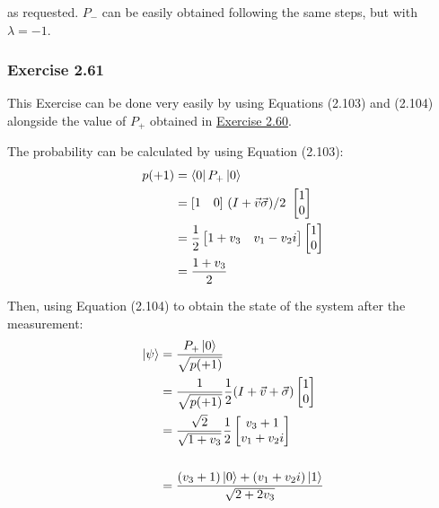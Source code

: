 as requested.
$P_-$ can be easily obtained following the same steps,
but with $\lambda = -1$.

\subsubsection{Exercise 2.61}
This Exercise can be done very easily by using Equations (2.103) and (2.104)
alongside the value of $P_+$ obtained in
\hyperref[sec:nielsen-and-chuang-exercise-2-60]{Exercise 2.60}.

The probability can be calculated by using Equation (2.103):
\begin{align}
    p(+1) &= \bra{0}P_+\ket{0} \\
    &= [ \begin{matrix} 1 & 0 \end{matrix} ]
        \ (I + \vec{v} \vec{\sigma}) / 2
        \ \left[ \begin{matrix} 1 \\ 0 \end{matrix} \right] \\
    &= \frac{1}{2} \left[ \begin{matrix} 1 + v_3 & v_1 - v_2i \end{matrix} \right]
        \left[ \begin{matrix} 1 \\ 0 \end{matrix} \right] \\
    &= \frac{1 + v_3}{2}
\end{align}

Then, using Equation (2.104) to obtain the state of the system
after the measurement:
\begin{align}
    \ket{\psi} &= \frac{P_+ \ket{0}}{\sqrt{p(+1)}} \\
    &= \frac{1}{\sqrt{p(+1)}} \frac{1}{2} (I + \vec{v} + \vec{\sigma})
        \left[ \begin{matrix} 1 \\ 0 \end{matrix} \right] \\
    &= \frac{\sqrt{2}}{\sqrt{1 + v_3}} \frac{1}{2}
        \left[ \begin{matrix} v_3 + 1 \\ v_1 + v_2i \end{matrix} \right] \\
    \notag \\
    &= \frac{(v_3 + 1)\ket{0} + (v_1 + v_2i)\ket{1}}{\sqrt{2 + 2v_3}}
\end{align}